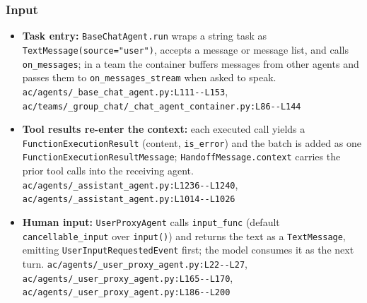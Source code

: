 \subsubsection*{Input}
\begin{itemize}
\item \textbf{Task entry:} \texttt{BaseChatAgent.\allowbreak{}run} wraps a string task as \texttt{TextMessage(\allowbreak{}source="user")}, accepts a message or message list, and calls \texttt{on\_\allowbreak{}messages}; in a team the container buffers messages from other agents and passes them to \texttt{on\_\allowbreak{}messages\_\allowbreak{}stream} when asked to speak. \texttt{ac/\allowbreak{}agents/\allowbreak{}\_\allowbreak{}base\_\allowbreak{}chat\_\allowbreak{}agent.\allowbreak{}py:\allowbreak{}L111-\allowbreak{}-\allowbreak{}L153}, \texttt{ac/\allowbreak{}teams/\allowbreak{}\_\allowbreak{}group\_\allowbreak{}chat/\allowbreak{}\_\allowbreak{}chat\_\allowbreak{}agent\_\allowbreak{}container.\allowbreak{}py:\allowbreak{}L86-\allowbreak{}-\allowbreak{}L144}
\item \textbf{Tool results re-enter the context:} each executed call yields a \texttt{FunctionExecutionResult} (content, \texttt{is\_\allowbreak{}error}) and the batch is added as one \texttt{FunctionExecutionResultMessage}; \texttt{HandoffMessage.\allowbreak{}context} carries the prior tool calls into the receiving agent. \texttt{ac/\allowbreak{}agents/\allowbreak{}\_\allowbreak{}assistant\_\allowbreak{}agent.\allowbreak{}py:\allowbreak{}L1236-\allowbreak{}-\allowbreak{}L1240}, \texttt{ac/\allowbreak{}agents/\allowbreak{}\_\allowbreak{}assistant\_\allowbreak{}agent.\allowbreak{}py:\allowbreak{}L1014-\allowbreak{}-\allowbreak{}L1026}
\item \textbf{Human input:} \texttt{UserProxyAgent} calls \texttt{input\_\allowbreak{}func} (default \texttt{cancellable\_\allowbreak{}input} over \texttt{input(\allowbreak{})}) and returns the text as a \texttt{TextMessage}, emitting \texttt{UserInputRequestedEvent} first; the model consumes it as the next turn. \texttt{ac/\allowbreak{}agents/\allowbreak{}\_\allowbreak{}user\_\allowbreak{}proxy\_\allowbreak{}agent.\allowbreak{}py:\allowbreak{}L22-\allowbreak{}-\allowbreak{}L27}, \texttt{ac/\allowbreak{}agents/\allowbreak{}\_\allowbreak{}user\_\allowbreak{}proxy\_\allowbreak{}agent.\allowbreak{}py:\allowbreak{}L165-\allowbreak{}-\allowbreak{}L170}, \texttt{ac/\allowbreak{}agents/\allowbreak{}\_\allowbreak{}user\_\allowbreak{}proxy\_\allowbreak{}agent.\allowbreak{}py:\allowbreak{}L186-\allowbreak{}-\allowbreak{}L200}
\end{itemize}

